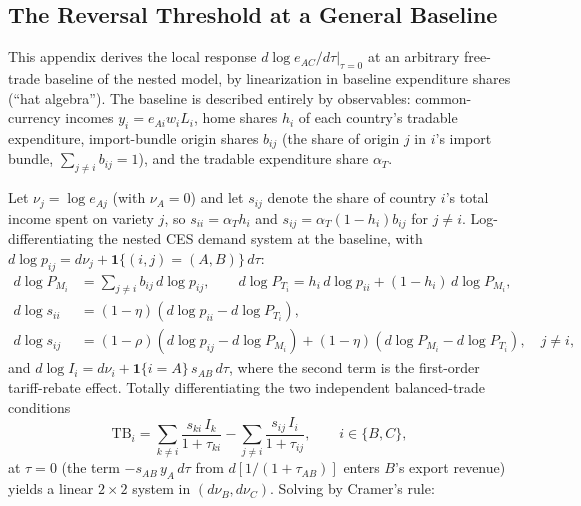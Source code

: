 \documentclass[11pt]{article}
\theoremstyle{plain}
\theoremstyle{remark}
\numberwithin{lemma}{section}
\numberwithin{proposition}{section}
\numberwithin{corollary}{section}
\newenvironment{revblock}{\par\begingroup\color{RevBlue}}{\endgroup\par}
\begin{document}
\begin{appendix}
\begin{revblock}
\section{The Reversal Threshold at a General Baseline}
\label{app:threshold}

This appendix derives the local response $d\log e_{AC}/d\tau|_{\tau=0}$ at an arbitrary free-trade baseline of the nested model, by linearization in baseline expenditure shares (``hat algebra''). The baseline is described entirely by observables: common-currency incomes $y_i = e_{Ai} w_i L_i$, home shares $h_i$ of each country's tradable expenditure, import-bundle origin shares $b_{ij}$ (the share of origin $j$ in $i$'s import bundle, $\sum_{j \neq i} b_{ij} = 1$), and the tradable expenditure share $\alpha_T$.

Let $\nu_j = \log e_{Aj}$ (with $\nu_A = 0$) and let $s_{ij}$ denote the share of country $i$'s total income spent on variety $j$, so $s_{ii} = \alpha_T h_i$ and $s_{ij} = \alpha_T (1-h_i) b_{ij}$ for $j \neq i$. Log-differentiating the nested CES demand system at the baseline, with $d\log p_{ij} = d\nu_j + \mathbf{1}\{(i,j)=(A,B)\}\, d\tau$:
\begin{align*}
d\log P_{M_i} &= \sum_{j \neq i} b_{ij}\, d\log p_{ij}, \qquad
d\log P_{T_i} = h_i\, d\log p_{ii} + (1-h_i)\, d\log P_{M_i}, \\
d\log s_{ii} &= (1-\eta)\left( d\log p_{ii} - d\log P_{T_i} \right), \\
d\log s_{ij} &= (1-\rho)\left( d\log p_{ij} - d\log P_{M_i} \right) + (1-\eta)\left( d\log P_{M_i} - d\log P_{T_i} \right), \quad j \neq i,
\end{align*}
and $d\log I_i = d\nu_i + \mathbf{1}\{i = A\}\, s_{AB}\, d\tau$, where the second term is the first-order tariff-rebate effect. Totally differentiating the two independent balanced-trade conditions
\[
\mathrm{TB}_i = \sum_{k \neq i} \frac{s_{ki}\, I_k}{1+\tau_{ki}} - \sum_{j \neq i} \frac{s_{ij}\, I_i}{1+\tau_{ij}}, \qquad i \in \{B, C\},
\]
at $\tau = 0$ (the term $-s_{AB}\, y_A\, d\tau$ from $d[1/(1+\tau_{AB})]$ enters $B$'s export revenue) yields a linear $2\times 2$ system in $(d\nu_B, d\nu_C)$. Solving by Cramer's rule:


\end{revblock}
\end{appendix}
\end{document}
